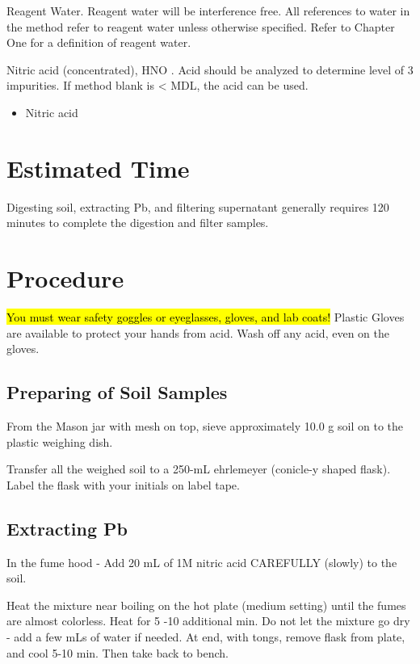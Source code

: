 \documentclass[12pt]{../SOP3_alpha}
\begin{document}
\NP Reagent Water. Reagent water will be interference free. All references to water in
the method refer to reagent water unless otherwise specified. Refer to Chapter One for a definition
of reagent water.

\NP Nitric acid (concentrated), HNO . Acid should be analyzed to determine level of 3
impurities. If method blank is < MDL, the acid can be used. 

\begin{itemize}
  \item Nitric acid
\end{itemize}

\section{Estimated Time}

\NP Digesting soil, extracting Pb, and filtering supernatant  generally requires 120 minutes to complete the digestion and filter samples.

\section{Procedure}

\hl{You must wear safety goggles or eyeglasses, gloves, and lab coats!} Plastic Gloves are available to protect your hands from acid. Wash off any acid, even on the gloves.

\subsection{Preparing of Soil Samples}

\NP From the Mason jar with mesh on top, sieve approximately 10.0 g soil on to the plastic weighing dish.

\NP Transfer all the weighed soil to a 250-mL ehrlemeyer (conicle-y shaped flask). Label the flask with your initials on label tape. 

\subsection{Extracting Pb}

\NP In the fume hood - Add 20 mL of 1M nitric acid CAREFULLY (slowly) to the soil.

\NP Heat the mixture near boiling on the hot plate (medium setting) until the fumes are almost colorless. Heat for 5 -10 additional min. Do not let the mixture go dry - add a few mLs of water if needed. At end, with tongs, remove flask from plate, and cool 5-10 min. Then take back to bench.
\end{document}

